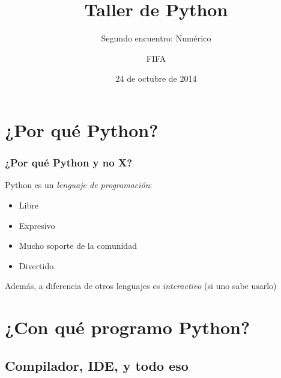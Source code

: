 \documentclass{beamer}
\title{Taller de Python}
\subtitle{Segundo encuentro: Numérico}
\author{FIFA}
\institute[FIFA]{Federación Interestudiantil de Física Argentina}
\date{24 de octubre de 2014}
\begin{document}
\begin{frame}
  \titlepage
\end{frame}


\section{¿Por qué Python?}

\begin{frame}
    \frametitle{¿Por qué Python y no X?}
    Python es un \emph{lenguaje de programación}:
    \begin{itemize}
    \item Libre
    \item Expresivo
    \item Mucho soporte de la comunidad
    \item Divertido. 
    \end{itemize}
    Además, a diferencia de otros lenguajes es \emph{interactivo} (si uno sabe usarlo)
\end{frame}


\section{¿Con qué programo Python?}

\subsection{Compilador, IDE, y todo eso}
\end{document}
